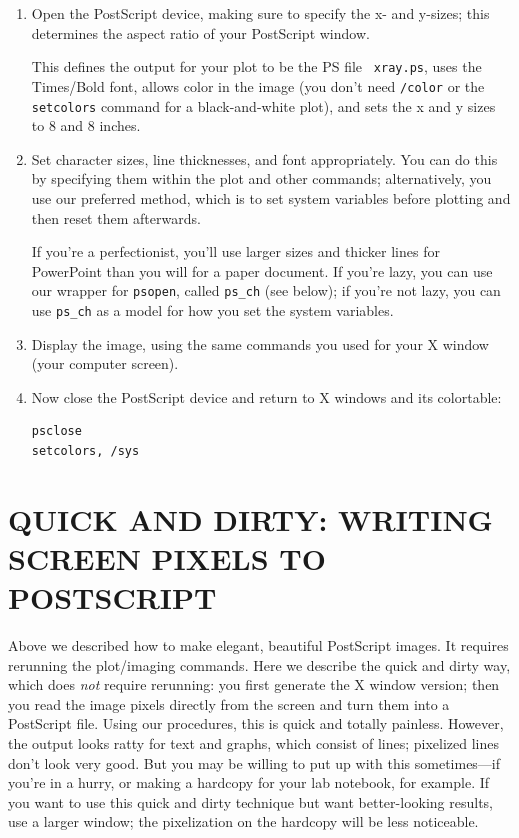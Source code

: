 \documentclass[psfig,preprint]{aastex}
\begin{document}
\begin{enumerate}
\item Open the PostScript device, making sure to specify the x- and
  y-sizes; this determines the aspect ratio of your PostScript window.


\noindent This defines the output for your plot to be the PS file {\tt
  xray.ps}, uses the Times/Bold font, allows color in the image (you
don't need {\tt /color} or the {\tt setcolors} command for a
black-and-white plot), and sets the x and y sizes to 8 and 8 inches.

\item Set character sizes, line thicknesses, and font appropriately. You
  can do this by specifying them within the plot and other commands;
  alternatively, you use our preferred method, which is to set system
  variables before plotting and then reset them afterwards. 

If you're a perfectionist, you'll use larger sizes and thicker lines for
PowerPoint than you will for a paper document. If you're lazy, you can
use our wrapper for {\tt psopen}, called {\tt ps\_ch} (see below); if
you're not lazy, you can use {\tt ps\_ch} as a model for how you set the
system variables.

\item Display the image, using the same commands you used for your X
  window (your computer screen). 

\item Now close the PostScript device and return to X windows and its
  colortable: 
\begin{verbatim}
psclose
setcolors, /sys
\end{verbatim}
\end{enumerate}

\section {QUICK AND DIRTY: WRITING SCREEN PIXELS TO
  POSTSCRIPT}
\label{dirty}

Above we described how to make elegant, beautiful PostScript
images.  It requires rerunning the plot/imaging commands.  Here we
describe the quick and dirty way, which does {\it not} require
rerunning: you first generate the X window version; then you read the
image pixels directly from the screen and turn them into a PostScript
file.  Using our procedures, this is quick and totally painless.
However, the output looks ratty for text and graphs, which consist of
lines; pixelized lines don't look very good.  But you may be willing to
put up with this sometimes---if you're in a hurry, or making a hardcopy
for your lab notebook, for example.  If you want to use this quick and
dirty technique but want better-looking results, use a larger window;
the pixelization on the hardcopy will be less noticeable.
\end{document}
